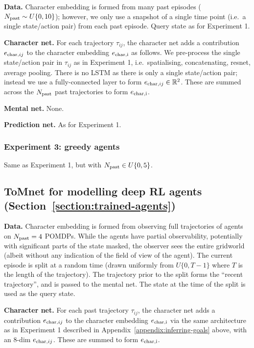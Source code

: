 \documentclass{article}
\begin{document}
{\bf Data.} Character embedding is formed from many past episodes ($N_{\mathrm{past}} \sim U\{0, 10\}$); however, we only use a snapshot of a single time point (i.e.\ a single state/action pair) from each past episode. Query state as for Experiment 1.

{\bf Character net.} For each trajectory $\tau_{ij}$, the character net adds a contribution $e_{\mathrm{char},ij}$ to the character embedding $e_{\mathrm{char,i}}$ as follows. We pre-process the single state/action pair in $\tau_{ij}$ as in Experiment 1, i.e.\ spatialising, concatenating, resnet, average pooling. There is no LSTM as there is only a single state/action pair; instead we use a fully-connected layer to form $e_{\mathrm{char},ij} \in \mathbb{R}^2$. These are summed across the $N_{\mathrm{past}}$  past trajectories to form $e_{\mathrm{char,i}}$.

{\bf Mental net.} None.

{\bf Prediction net.} As for Experiment 1.

\subsubsection{Experiment 3: greedy agents}

Same as Experiment 1, but with $N_{\mathrm{past}} \in U\{0, 5\}$. 


\subsection{ToMnet for modelling deep RL agents (Section~\ref{section:trained-agents})}
\label{appendix:trained-agents}

{\bf Data.} Character embedding is formed from observing full trajectories of agents on $N_{\mathrm{past}} = 4$ POMDPs. While the agents have partial observability, potentially with significant parts of the state masked, the observer sees the entire gridworld (albeit without any indication of the field of view of the agent). The current episode is split at a random time (drawn uniformly from $U\{0, T-1\}$ where $T$ is the length of the trajectory). The trajectory prior to the split forms the ``recent trajectory'', and is passed to the mental net. The state at the time of the split is used as the query state.

{\bf Character net.} For each past trajectory $\tau_{ij}$, the character net adds a contribution $e_{\mathrm{char},ij}$ to the character embedding $e_{\mathrm{char,i}}$ via the same architecture as in Experiment 1 described in Appendix~\ref{appendix:inferring-goals} above, with an 8-dim $e_{\mathrm{char},ij}$. These are summed to form $e_{\mathrm{char,i}}$.
\end{document}
